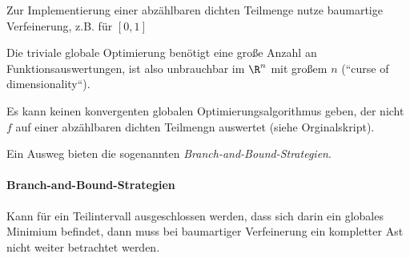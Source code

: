 Zur Implementierung einer abzählbaren dichten Teilmenge nutze baumartige Verfeinerung, z.B. für $[0,1]$

Die triviale globale Optimierung benötigt eine große Anzahl an Funktionsauswertungen, ist also unbrauchbar im $\R^n$ mit großem $n$ (“curse of dimensionality“).

Es kann keinen konvergenten globalen Optimierungsalgorithmus geben, der nicht $f$ auf einer abzählbaren dichten Teilmengn auswertet (siehe Orginalskript).

Ein Ausweg bieten die sogenannten \emph{Branch-and-Bound-Strategien}.


\paragraph{Branch-and-Bound-Strategien}


Kann für ein Teilintervall ausgeschlossen werden, dass sich darin ein globales Minimium befindet, dann muss bei baumartiger Verfeinerung ein kompletter Ast nicht weiter betrachtet werden.
